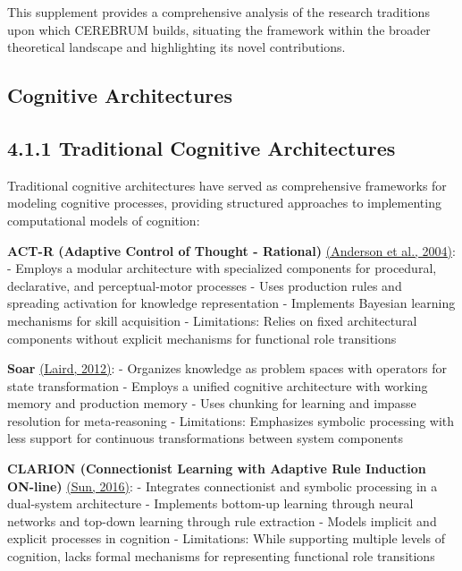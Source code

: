 \documentclass[
  11pt,
  letterpaper,
]{article}
\begin{document}
This supplement provides a comprehensive analysis of the research
traditions upon which CEREBRUM builds, situating the framework within
the broader theoretical landscape and highlighting its novel
contributions.

\hypertarget{cognitive-architectures}{%
\subsection{Cognitive Architectures}\label{cognitive-architectures}}

\hypertarget{traditional-cognitive-architectures}{%
\subsection{4.1.1 Traditional Cognitive
Architectures}\label{traditional-cognitive-architectures}}

Traditional cognitive architectures have served as comprehensive
frameworks for modeling cognitive processes, providing structured
approaches to implementing computational models of cognition:

\textbf{ACT-R (Adaptive Control of Thought - Rational)}
\protect\hyperlink{references}{(Anderson et al., 2004)}: - Employs a
modular architecture with specialized components for procedural,
declarative, and perceptual-motor processes - Uses production rules and
spreading activation for knowledge representation - Implements Bayesian
learning mechanisms for skill acquisition - Limitations: Relies on fixed
architectural components without explicit mechanisms for functional role
transitions

\textbf{Soar} \protect\hyperlink{references}{(Laird, 2012)}: - Organizes
knowledge as problem spaces with operators for state transformation -
Employs a unified cognitive architecture with working memory and
production memory - Uses chunking for learning and impasse resolution
for meta-reasoning - Limitations: Emphasizes symbolic processing with
less support for continuous transformations between system components

\textbf{CLARION (Connectionist Learning with Adaptive Rule Induction
ON-line)} \protect\hyperlink{references}{(Sun, 2016)}: - Integrates
connectionist and symbolic processing in a dual-system architecture -
Implements bottom-up learning through neural networks and top-down
learning through rule extraction - Models implicit and explicit
processes in cognition - Limitations: While supporting multiple levels
of cognition, lacks formal mechanisms for representing functional role
transitions
\end{document}
